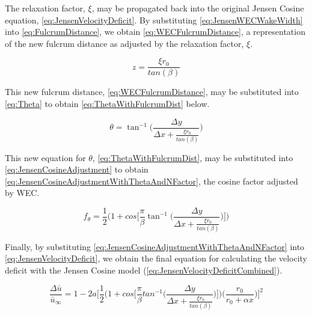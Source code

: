 \documentclass[a4paper]{jpconf}
\begin{document}
The relaxation factor, $\xi$, may be propagated back into the original Jensen Cosine equation, \cref{eq:JensenVelocityDeficit}. By substituting \cref{eq:JensenWECWakeWidth} into \cref{eq:FulcrumDistance}, we obtain \cref{eq:WECFulcrumDistance}, a representation of the new fulcrum distance as adjusted by the relaxation factor, $\xi$.

\begin{equation}
    z = \frac{\xi r_0}{tan(\beta)}
    \label{eq:WECFulcrumDistance}
\end{equation}

This new fulcrum distance, \cref{eq:WECFulcrumDistance}, may be substituted into \cref{eq:Theta} to obtain \cref{eq:ThetaWithFulcrumDist} below.

\begin{equation}
    \theta = \tan^{-1}\Bigg( \frac{\Delta y}{\Delta x + \frac{\xi r_0}{tan(\beta)}} \Bigg)
    \label{eq:ThetaWithFulcrumDist}
\end{equation}

This new equation for $\theta$, \cref{eq:ThetaWithFulcrumDist}, may be substituted into \cref{eq:JensenCosineAdjustment} to obtain \cref{eq:JensenCosineAdjustmentWithThetaAndNFactor}, the cosine factor adjusted by WEC.

\begin{equation}
    f_\theta = \frac{1}{2} \Bigg( 1 + cos \Bigg[ \frac{\pi}{\beta} \tan^{-1}\Bigg( \frac{\Delta y}{\Delta x + \frac{\xi r_0}{tan(\beta)}} \Bigg) \Bigg] \Bigg)
    \label{eq:JensenCosineAdjustmentWithThetaAndNFactor}
\end{equation}

Finally, by substituting \cref{eq:JensenCosineAdjustmentWithThetaAndNFactor} into \cref{eq:JensenVelocityDeficit}, we obtain the final equation for calculating the velocity deficit with the Jensen Cosine model (\cref{eq:JensenVelocityDeficitCombined}).

\begin{equation}
    \frac{\Delta \bar{u}}{\bar{u}_\infty} = 1 - 2a \Bigg[ \frac{1}{2} \Bigg(1 + cos\Bigg[\frac{\pi}{\beta} tan^{-1}\Bigg(\frac{\Delta y}{\Delta x + \frac{\xi r_0}{tan(\beta)}} \Bigg) \Bigg] \Bigg) \bigg(\frac{r_0}{r_0 + \alpha x} \bigg) \Bigg]^2
    \label{eq:JensenVelocityDeficitCombined}
\end{equation}
\end{document}
